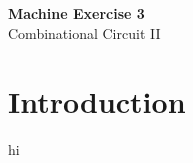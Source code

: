 \clearpage
\setcounter{page}{1}

\begin{center}
    \vspace*{3em}
    {\LARGE \textbf{Machine Exercise 3}}\\
    {\vspace{1.5em}}
    {\large Combinational Circuit II}\\
\end{center}

\section{Introduction}
    hi